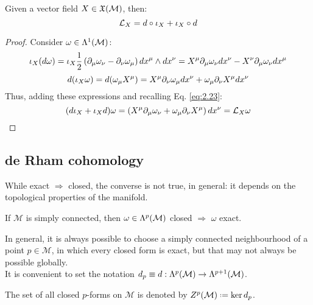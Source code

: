 \begin{theorem}[Cartan]
  Given a vector field $ X \in\mathfrak{X}(\mathcal{M}) $, then:
  \begin{equation}
    \mathcal{L}_X = d \circ \iota_X + \iota_X \circ d
    \label{eq:2.41}
  \end{equation}
\end{theorem}
\begin{proof}
  Consider $ \omega \in\Lambda^{1}(\mathcal{M}) $:
  \begin{equation*}
    \iota_X (d\omega) = \iota_X \frac{1}{2} \left( \partial_{\mu} \omega_{\nu} - \partial_{\nu} \omega_{\mu} \right) dx^{\mu} \wedge dx^{\nu} = X^{\mu} \partial_{\mu} \omega_{\nu} dx^{\nu} - X^{\nu} \partial_{\mu} \omega_{\nu} dx^{\mu}
  \end{equation*}
  \begin{equation*}
    d(\iota_X \omega) = d (\omega_{\mu} X^{\mu}) = X^{\mu} \partial_{\nu} \omega_{\mu} dx^{\nu} + \omega_{\mu} \partial_{\nu} X^{\mu} dx^{\nu}
  \end{equation*}
  Thus, adding these expressions and recalling Eq. \ref{eq:2.23}:
  \begin{equation*}
    (d \iota_X + \iota_X d) \omega = \left( X^{\mu} \partial_{\mu} \omega_{\nu} + \omega_{\mu} \partial_{\nu} X^{\mu} \right) dx^{\nu} = \mathcal{L}_X \omega
  \end{equation*}
\end{proof}

\subsection{de Rham cohomology}

While exact $ \Rightarrow $ closed, the converse is not true, in general: it depends on the topological properties of the manifold.

\begin{lemma}[Poincaré]
  If $ \mathcal{M} $ is simply connected, then $ \omega\in\Lambda^{p}(\mathcal{M}) $ closed $ \Rightarrow $ $ \omega $ exact.
\end{lemma}

In general, it is always possible to choose a simply connected neighbourhood of a point $ p \in \mathcal{M} $, in which every closed form is exact, but that may not always be possible globally.\\
It is convenient to set the notation $ d_p \equiv d : \Lambda^{p}(\mathcal{M}) \rightarrow \Lambda^{p+1}(\mathcal{M}) $.

\begin{definition}
  The set of all closed $ p $-forms on $ \mathcal{M} $ is denoted by $ Z^p(\mathcal{M}) \defeq \ker d_p $.
\end{definition}


